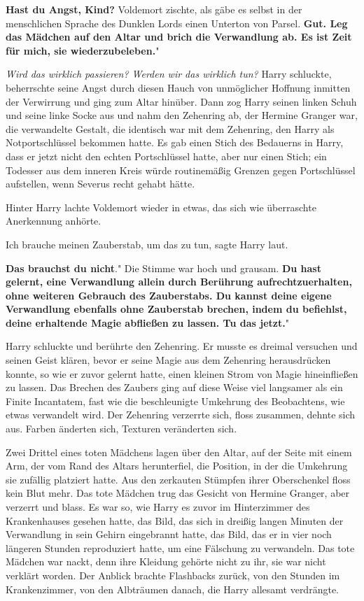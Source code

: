 \glqq \textbf{Hast du Angst, Kind?}\grqq{} Voldemort zischte, als gäbe es selbst
in der menschlichen Sprache des Dunklen Lords einen Unterton von Parsel. \glqq
\textbf{Gut. Leg das Mädchen auf den Altar und brich die Verwandlung ab. Es ist
Zeit für mich, sie wiederzubeleben.}"

\emph{Wird das wirklich passieren? Werden wir das wirklich tun?}
Harry schluckte, beherrschte seine Angst durch diesen Hauch von unmöglicher
Hoffnung inmitten der Verwirrung und ging zum Altar hinüber. Dann zog Harry
seinen linken Schuh und seine linke Socke aus und nahm den Zehenring ab, der
Hermine Granger war, die verwandelte Gestalt, die identisch war mit dem
Zehenring, den Harry als Notportschlüssel bekommen hatte. Es gab einen Stich des
Bedauerns in Harry, dass er jetzt nicht den echten Portschlüssel hatte, aber nur
einen Stich; ein Todesser aus dem inneren Kreis würde routinemäßig Grenzen gegen
Portschlüssel aufstellen, wenn Severus recht gehabt hätte.

Hinter Harry lachte Voldemort wieder in etwas, das sich wie überraschte
Anerkennung anhörte.

\glqq Ich brauche meinen Zauberstab, um das zu tun\grqq{}, sagte Harry laut.

\glqq \textbf{Das brauchst du nicht}." Die Stimme war hoch und grausam. \glqq
\textbf{Du hast gelernt, eine Verwandlung allein durch Berührung
aufrechtzuerhalten, ohne weiteren Gebrauch des Zauberstabs. Du kannst deine
eigene Verwandlung ebenfalls ohne Zauberstab brechen, indem du befiehlst, deine
erhaltende Magie abfließen zu lassen. Tu das jetzt.}"

Harry schluckte und berührte den Zehenring. Er musste es dreimal versuchen und
seinen Geist klären, bevor er seine Magie aus dem Zehenring herausdrücken
konnte, so wie er zuvor gelernt hatte, einen kleinen Strom von Magie
hineinfließen zu lassen. Das Brechen des Zaubers ging auf diese Weise viel
langsamer als ein Finite Incantatem, fast wie die beschleunigte Umkehrung des
Beobachtens, wie etwas verwandelt wird. Der Zehenring verzerrte sich, floss
zusammen, dehnte sich aus. Farben änderten sich, Texturen veränderten sich.

Zwei Drittel eines toten Mädchens lagen über den Altar, auf der Seite mit einem
Arm, der vom Rand des Altars herunterfiel, die Position, in der die Umkehrung
sie zufällig platziert hatte. Aus den zerkauten Stümpfen ihrer Oberschenkel
floss kein Blut mehr. Das tote Mädchen trug das Gesicht von Hermine Granger,
aber verzerrt und blass. Es war so, wie Harry es zuvor im Hinterzimmer des
Krankenhauses gesehen hatte, das Bild, das sich in dreißig langen Minuten der
Verwandlung in sein Gehirn eingebrannt hatte, das Bild, das er in vier noch
längeren Stunden reproduziert hatte, um eine Fälschung zu verwandeln. Das tote
Mädchen war nackt, denn ihre Kleidung gehörte nicht zu ihr, sie war nicht
verklärt worden. Der Anblick brachte Flashbacks zurück, von den Stunden im
Krankenzimmer, von den Albträumen danach, die Harry allesamt verdrängte.

